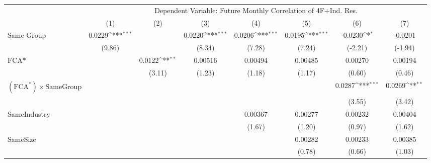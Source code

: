 {
\def\sym#1{\ifmmode^{#1}\else\(^{#1}\)\fi}
\begin{tabular}{l*{7}{c}}
\hline\hline
                &\multicolumn{7}{c}{Dependent Variable: Future Monthly Correlation of 4F+Ind. Res.}                                                  \\\cmidrule(lr){2-8}
                &\multicolumn{1}{c}{(1)}         &\multicolumn{1}{c}{(2)}         &\multicolumn{1}{c}{(3)}         &\multicolumn{1}{c}{(4)}         &\multicolumn{1}{c}{(5)}         &\multicolumn{1}{c}{(6)}         &\multicolumn{1}{c}{(7)}         \\
\hline
Same Group      &   0.0229\sym{***}&                  &   0.0220\sym{***}&   0.0206\sym{***}&   0.0195\sym{***}&  -0.0230\sym{*}  &  -0.0201         \\
                &   (9.86)         &                  &   (8.34)         &   (7.28)         &   (7.24)         &  (-2.21)         &  (-1.94)         \\
[1em]
$ \text{FCA*} $ &                  &   0.0122\sym{**} &  0.00516         &  0.00494         &  0.00485         &  0.00270         &  0.00194         \\
                &                  &   (3.11)         &   (1.23)         &   (1.18)         &   (1.17)         &   (0.60)         &   (0.46)         \\
[1em]
 $ (\text{FCA}^*) \times {\text{SameGroup} }  $ &                  &                  &                  &                  &                  &   0.0287\sym{***}&   0.0269\sym{**} \\
                &                  &                  &                  &                  &                  &   (3.55)         &   (3.42)         \\
[1em]
SameIndustry    &                  &                  &                  &  0.00367         &  0.00277         &  0.00232         &  0.00404         \\
                &                  &                  &                  &   (1.67)         &   (1.20)         &   (0.97)         &   (1.62)         \\
[1em]
SameSize        &                  &                  &                  &                  &  0.00282         &  0.00233         &  0.00385         \\
                &                  &                  &                  &                  &   (0.78)         &   (0.66)         &   (1.03)         \\

\end{tabular}}
